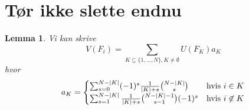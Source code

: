 \documentclass[a4paper, 12pt]{article}
\newtheorem{lemma}{Lemma}
\begin{document}
\newpage
\appendix
\section{Tør ikke slette endnu}
\begin{lemma}\label{coefficient}
Vi kan skrive
\begin{equation}
V(F_i)=\sum_{K\subseteq \{1, \dots, N\}, K\neq \emptyset} U(F_K)a_K
\end{equation}
hvor 
\begin{equation}
a_K=\begin{cases} \sum_{s=0}^{N-|K|} (-1)^s \frac{1}{|K|+s}{N-|K|\choose s} \quad &\textup{hvis } i\in K\\
\sum_{s=1}^{N-|K|}\frac{1}{|K|+s}{N-|K|-1 \choose s-1} (-1)^s &\textup{hvis } i\not\in K
\end{cases}
\end{equation}
\end{lemma}
\end{document}
